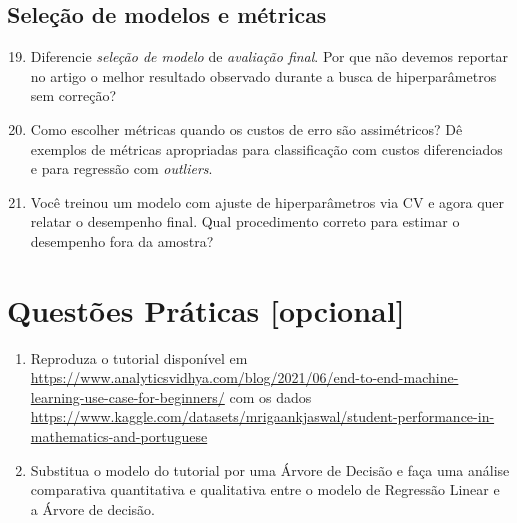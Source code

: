 \documentclass{article}
\begin{document}
\subsection{Seleção de modelos e métricas}
\begin{enumerate}
  \setcounter{enumi}{18}
  \item Diferencie \textit{seleção de modelo} de \textit{avaliação final}. Por que não devemos reportar no artigo o melhor resultado observado durante a busca de hiperparâmetros sem correção?
  \item Como escolher métricas quando os custos de erro são assimétricos? Dê exemplos de métricas apropriadas para classificação com custos diferenciados e para regressão com \textit{outliers}.
  \item Você treinou um modelo com ajuste de hiperparâmetros via CV e agora quer relatar o desempenho final. Qual procedimento correto para estimar o desempenho fora da amostra?
\end{enumerate}


  \section{Questões Práticas [opcional]}

    \begin{enumerate}
        \item Reproduza o tutorial disponível em \url{https://www.analyticsvidhya.com/blog/2021/06/end-to-end-machine-learning-use-case-for-beginners/} com os dados \url{https://www.kaggle.com/datasets/mrigaankjaswal/student-performance-in-mathematics-and-portuguese}
        \item Substitua o modelo do tutorial por uma Árvore de Decisão e faça uma análise comparativa quantitativa e qualitativa entre o modelo de Regressão Linear e a Árvore de decisão.
    \end{enumerate}


%
%
\end{document}
